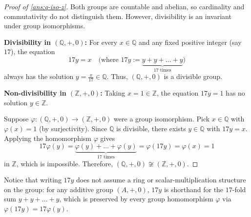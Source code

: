 \begin{content}



\begin{proof}[Proof of \cref{ans:q-iso-z}]
Both groups are countable and abelian, so cardinality and commutativity do not distinguish them. However, divisibility is an invariant under group isomorphisms.

\textbf{Divisibility in $(\mathbb{Q}, +, 0)$:} For every $x \in \mathbb{Q}$ and any fixed positive integer (say $17$), the equation
\[
17y = x \quad \bigl(\text{where } 17y := \underbrace{y + y + \dots + y}_{17 \text{ times}}\bigr)
\]
always has the solution $y = \frac{x}{17} \in \mathbb{Q}$. Thus, $(\mathbb{Q}, +, 0)$ is a divisible group.

\textbf{Non-divisibility in $(\mathbb{Z}, +, 0)$:} Taking $x = 1 \in \mathbb{Z}$, the equation $17y = 1$ has no solution $y \in \mathbb{Z}$.

Suppose $\varphi \colon (\mathbb{Q}, +, 0) \to (\mathbb{Z}, +, 0)$ were a group isomorphism. Pick $x \in \mathbb{Q}$ with $\varphi(x) = 1$ (by surjectivity). Since $\mathbb{Q}$ is divisible, there exists $y \in \mathbb{Q}$ with $17y = x$. Applying the homomorphism $\varphi$ gives
\[
17\varphi(y) = \underbrace{\varphi(y) + \dots + \varphi(y)}_{17 \text{ times}} = \varphi(17y) = \varphi(x) = 1
\]
in $\mathbb{Z}$, which is impossible. Therefore, $(\mathbb{Q}, +, 0) \not\cong (\mathbb{Z}, +, 0)$.
\end{proof}

\begin{steps}[Why $ny = x$ Is Purely Group-Theoretic]
Notice that writing $17y$ does not assume a ring or scalar-multiplication structure on the group: for any additive group $(A, +, 0)$, $17y$ is shorthand for the $17$-fold sum $y + y + \dots + y$, which is preserved by every group homomorphism $\varphi$ via $\varphi(17y) = 17\varphi(y)$.
\end{steps}
\end{content}

